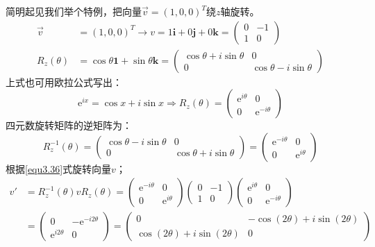 简明起见我们举个特例，把向量$\vec{v} = (1, 0, 0)^T$绕$z$轴旋转。
\begin{align}
\label{equ3.39}
\vec{v} &= (1, 0, 0)^T \rightarrow v = 1\mathbf{i} + 0\mathbf{j} + 0\mathbf{k} =
	\begin{pmatrix}
		0 & -1 \\ 1 & 0
	\end{pmatrix}
\\
\label{equ3.40}
R_z(\theta) &= \cos \theta \mathbf{1} + \sin \theta \mathbf{k} =
	\begin{pmatrix}
		\cos \theta + i\sin \theta & 0 \\
		0 & \cos \theta - i\sin \theta
	\end{pmatrix}
\end{align}
上式也可用欧拉公式写出：
\begin{equation}
\label{equ3.41}
\mathrm{e}^{ix} = \cos x + i\sin x
\Rightarrow
R_z(\theta) = \begin{pmatrix}
				\mathrm{e}^{i\theta} & 0 \\
				0 & \mathrm{e}^{-i\theta}
			  \end{pmatrix}
\end{equation}
四元数旋转矩阵的逆矩阵为：
\begin{equation}
\label{equ3.42}
R_z^{-1} (\theta) =
	\begin{pmatrix}
		\cos \theta - i\sin \theta & 0 \\
		0 & \cos \theta + i\sin \theta
	\end{pmatrix}
=
	\begin{pmatrix}
		\mathrm{e}^{-i\theta} & 0 \\
		0 & \mathrm{e}^{i\theta}
	\end{pmatrix}
\end{equation}
根据\ref{equ3.36}式旋转向量$v$；
\begin{align}
v' &= R_z^{-1} (\theta) v R_z(\theta) =
	\begin{pmatrix}
		\mathrm{e}^{-i\theta} & 0 \\
		0 & \mathrm{e}^{i\theta}
	\end{pmatrix}
	\begin{pmatrix}
	0 & -1 \\ 1 & 0
	\end{pmatrix}
	\begin{pmatrix}
		\mathrm{e}^{i\theta} & 0 \\
		0 & \mathrm{e}^{-i\theta}
	\end{pmatrix}
\nonumber \\
\label{equ3.43}
&= \begin{pmatrix}
		0 & -\mathrm{e}^{-i 2\theta} \\
		\mathrm{e}^{i 2\theta} & 0
	\end{pmatrix}
= \begin{pmatrix}
		0 & -\cos (2\theta) + i\sin (2\theta) \\
		\cos (2\theta) + i\sin (2\theta) & 0
  \end{pmatrix}
\end{align}
